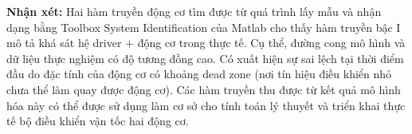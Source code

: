                \hspace{0.6cm}\textbf{Nhận xét:} Hai hàm truyền động cơ tìm được từ quá trình lấy mẫu
               và nhận dạng bằng Toolbox System Identification của Matlab cho thấy hàm truyền bậc I mô 
               tả khá sát hệ driver + động cơ trong thực tế. Cụ thể, đường cong mô hình và dữ liệu thực nghiệm có độ tương 
               đồng cao. Có xuất hiện sự sai lệch tại thời điểm đầu do đặc tính của động cơ có khoảng dead zone (nơi tín hiệu điều khiển nhỏ chưa thể làm quay được động cơ). Các hàm truyền thu được từ kết quả mô hình hóa này có thể được
               sử dụng làm cơ sở cho tính toán lý thuyết và triển khai thực tế bộ điều khiển vận tốc hai động cơ.
     




          


